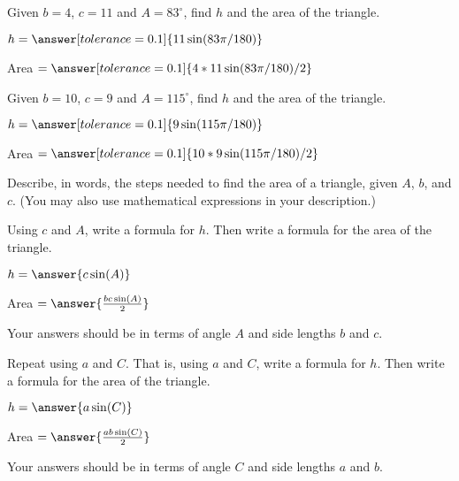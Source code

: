 \documentclass[number]{ximera}
\begin{document}
\begin{problem}
Given $b = 4$, $c=11$ and $A = 83^\circ$, find $h$ and the area of the triangle.

$h=\answer[tolerance=0.1]{11\sin(83\pi/180)}$

Area $=\answer[tolerance=0.1]{4*11\sin(83\pi/180)/2}$
\end{problem}

\begin{problem}
Given $b = 10$, $c=9$ and $A = 115^\circ$, find $h$ and the area of the triangle.

$h=\answer[tolerance=0.1]{9\sin(115\pi/180)}$

Area $=\answer[tolerance=0.1]{10*9\sin(115\pi/180)/2}$
\end{problem}

\begin{question}
Describe, in words, the steps needed to find the area of a triangle, given $A$, $b$, and $c$. (You may also use mathematical expressions in your description.)
\begin{freeResponse}
\end{freeResponse}
\end{question}


\begin{question}
Using $c$ and $A$, write a formula for $h$. Then write a formula for the area of the triangle. 
\begin{image}
\end{image}

$h=\answer{c\sin(A)}$

Area $=\answer{\frac{bc\sin(A)}{2}}$

\begin{hint}
Your answers should be in terms of angle $A$ and side lengths $b$ and $c$.
\end{hint}
\end{question}

\begin{question}
Repeat using $a$ and $C$. That is, using $a$ and $C$, write a formula for $h$. Then write a formula for the area of the triangle.

$h=\answer{a\sin(C)}$

Area $=\answer{\frac{ab\sin(C)}{2}}$

\begin{hint}
Your answers should be in terms of angle $C$ and side lengths $a$ and $b$.
\end{hint}
\end{question}
\end{document}
